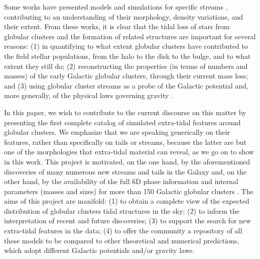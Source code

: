 Some works have presented models and simulations for specific streams \citep{dehnen04, mastrobuono12, banik19, bonaca19, banik21, bonaca21}, contributing to an understanding of their morphology, density variations, and their extent. From these works, it is clear that the tidal loss of stars from globular clusters and the formation of related structures are important for several reasons: (1) in quantifying to what extent globular clusters have contributed to the field stellar populations, from the halo to the disk to the bulge, and to what extent they still do; (2) reconstructing the properties (in terms of numbers and masses) of the early Galactic globular clusters, through their current mass loss; and (3) using globular cluster streams as a probe of the Galactic potential and, more generally, of the physical laws governing gravity \citep[see, e.g., ][]{thomas18, bianchini19, naik20, banik21, banik21b}.

In this paper, we wish to contribute to the current discourse on this matter by presenting the first complete catalog of simulated extra-tidal features around globular clusters. We emphasize that we are speaking generically on their features, rather than specifically on tails or streams, because the latter are but one of the morphologies that extra-tidal material can reveal, as we go on to show in this work. This project is motivated, on the one hand, by the aforementioned discoveries of many numerous new streams and  tails in the Galaxy and, on the other hand, by the availability of the full 6D phase information and internal parameters (masses and sizes) for more than 150 Galactic globular clusters \citep{baumgardt18, baumgardt21, vasiliev21}. The aims of this project are manifold: (1) to obtain a complete view of the expected distribution of globular clusters tidal structures in the sky; (2) to inform the interpretation of recent and future discoveries; (3) to support the search for new extra-tidal features in the data; (4) to offer the community a repository of all these models to be compared to other theoretical and numerical predictions, which adopt different Galactic potentials and/or gravity laws.    